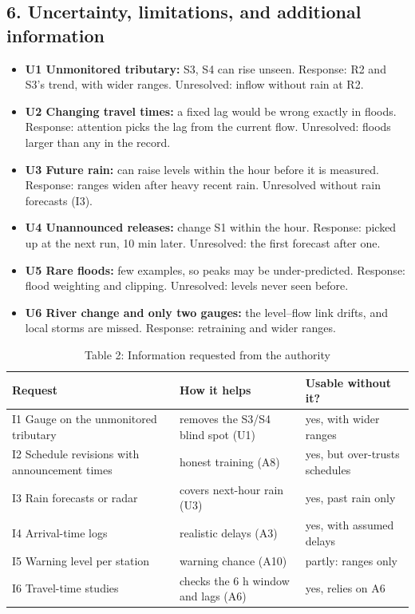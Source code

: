 \documentclass[10pt,a4paper]{article}
\begin{document}
\subsection{6. Uncertainty, limitations, and additional information}
\begin{itemize}
\item \textbf{U1 Unmonitored tributary:} S3, S4 can rise unseen. Response: R2 and S3's trend, with wider ranges. Unresolved: inflow without rain at R2.
\item \textbf{U2 Changing travel times:} a fixed lag would be wrong exactly in floods. Response: attention picks the lag from the current flow. Unresolved: floods larger than any in the record.
\item \textbf{U3 Future rain:} can raise levels within the hour before it is measured. Response: ranges widen after heavy recent rain. Unresolved without rain forecasts (I3).
\item \textbf{U4 Unannounced releases:} change S1 within the hour. Response: picked up at the next run, 10 min later. Unresolved: the first forecast after one.
\item \textbf{U5 Rare floods:} few examples, so peaks may be under-predicted. Response: flood weighting and clipping. Unresolved: levels never seen before.
\item \textbf{U6 River change and only two gauges:} the level--flow link drifts, and local storms are missed. Response: retraining and wider ranges.
\end{itemize}

\begin{table}[H]
\caption{Table 2: Information requested from the authority}
\scriptsize
\begin{tabularx}{\textwidth}{@{}P{4.4cm}LP{4.2cm}@{}}
\toprule
Request & How it helps & Usable without it? \\
\midrule
I1 Gauge on the unmonitored tributary & removes the S3/S4 blind spot (U1) & yes, with wider ranges \\
I2 Schedule revisions with announcement times & honest training (A8) & yes, but over-trusts schedules \\
I3 Rain forecasts or radar & covers next-hour rain (U3) & yes, past rain only \\
I4 Arrival-time logs & realistic delays (A3) & yes, with assumed delays \\
I5 Warning level per station & warning chance (A10) & partly: ranges only \\
I6 Travel-time studies & checks the 6 h window and lags (A6) & yes, relies on A6 \\
\bottomrule
\end{tabularx}
\end{table}
\end{document}
